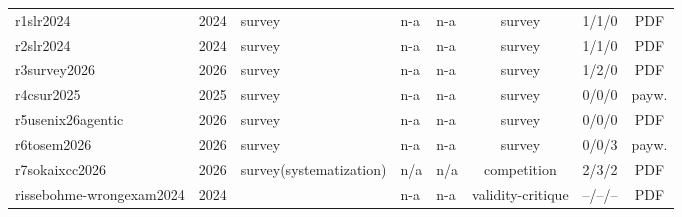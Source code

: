 \begin{table}[t]
{\begin{tabular}{lllllccc}
r1slr2024 & 2024 & survey & n-a & n-a & survey & 1/1/0 & PDF\\
r2slr2024 & 2024 & survey & n-a & n-a & survey & 1/1/0 & PDF\\
r3survey2026 & 2026 & survey & n-a & n-a & survey & 1/2/0 & PDF\\
r4csur2025 & 2025 & survey & n-a & n-a & survey & 0/0/0 & payw.\\
r5usenix26agentic & 2026 & survey & n-a & n-a & survey & 0/0/0 & PDF\\
r6tosem2026 & 2026 & survey & n-a & n-a & survey & 0/0/3 & payw.\\
r7sokaixcc2026 & 2026 & survey(systematization) & n/a & n/a & competition & 2/3/2 & PDF\\
rissebohme-wrongexam2024 & 2024 &  & n-a & n-a & validity-critique & --/--/-- & PDF\\
\bottomrule
\end{tabular}}
\end{table}